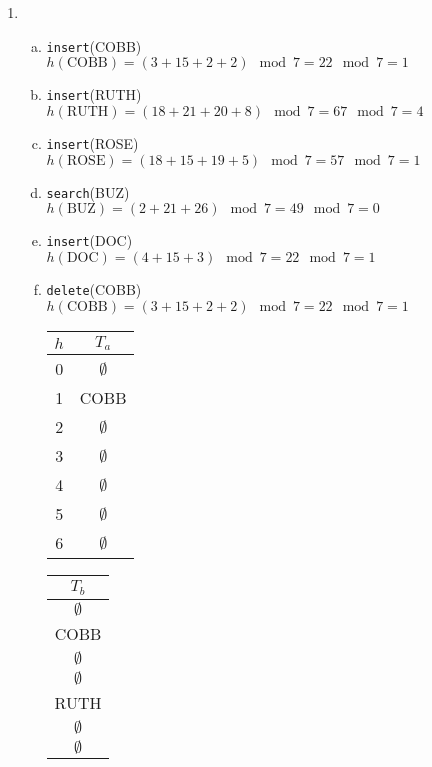 \documentclass{article}
\begin{document}
\begin{enumerate}[1.]
    \item 
    \begin{enumerate}[(a)]
        \item \texttt{insert}(COBB) \\
        $h(\text{COBB}) = (3 + 15 + 2 + 2) \mod 7 = 22 \mod 7 = 1$
        \item \texttt{insert}(RUTH) \\
        $h(\text{RUTH}) = (18 + 21 + 20 + 8) \mod 7 = 67 \mod 7 = 4$
        \item \texttt{insert}(ROSE) \\
        $h(\text{ROSE}) = (18 + 15 + 19 + 5) \mod 7 = 57 \mod 7 = 1$
        \item \texttt{search}(BUZ) \\
        $h(\text{BUZ}) = (2 + 21 + 26) \mod 7 = 49 \mod 7 = 0$
        \newpage
        \item \texttt{insert}(DOC) \\
        $h(\text{DOC}) = (4 + 15 + 3) \mod 7 = 22 \mod 7 = 1$
        \item \texttt{delete}(COBB) \\
        $h(\text{COBB}) = (3 + 15 + 2 + 2) \mod 7 = 22 \mod 7 = 1$
    	\begin{table}[ht]
    		\centering
    		{\small
    		\begin{tabular}{|c|c}
    			\toprule
    			$h$ & $T_a$ \\
    			\midrule
    			0 & $\emptyset$ \\
    			1 & COBB \\
    			2 & $\emptyset$ \\
    			3 & $\emptyset$ \\
    			4 & $\emptyset$ \\
    			5 & $\emptyset$ \\
    			6 & $\emptyset$ \\
    			\bottomrule
    		\end{tabular}
    		\begin{tabular}{|c}
    			\toprule
    			$T_b$ \\
    			\midrule
    			$\emptyset$ \\
    			COBB \\
    			$\emptyset$ \\
    			$\emptyset$ \\
    			RUTH \\
    			$\emptyset$ \\
    			$\emptyset$ \\

\end{tabular}}
\end{table}
\end{enumerate}
\end{enumerate}
\end{document}
